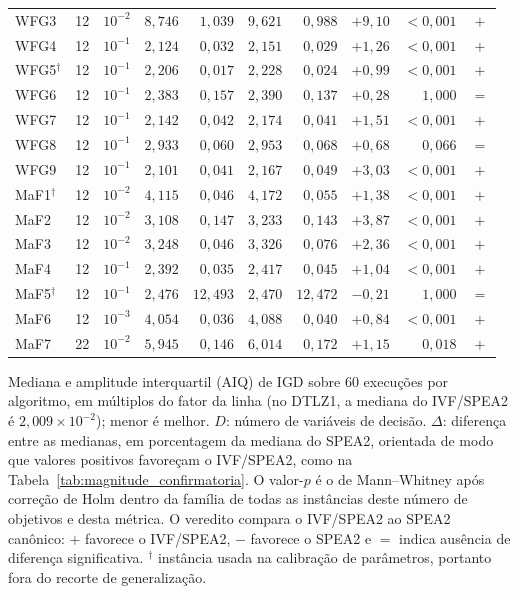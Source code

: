 \begin{table}[!htb]
\begin{tabular*}{\textwidth}{@{\extracolsep{\fill}}lrcrrrrrrc@{}}
        WFG3 & 12 & $10^{-2}$ & $8{,}746$ & $1{,}039$ & $9{,}621$ & $0{,}988$ & $+9{,}10$ & $<0{,}001$ & $+$ \\
        WFG4 & 12 & $10^{-1}$ & $2{,}124$ & $0{,}032$ & $2{,}151$ & $0{,}029$ & $+1{,}26$ & $<0{,}001$ & $+$ \\
        WFG5$^{\dagger}$ & 12 & $10^{-1}$ & $2{,}206$ & $0{,}017$ & $2{,}228$ & $0{,}024$ & $+0{,}99$ & $<0{,}001$ & $+$ \\
        WFG6 & 12 & $10^{-1}$ & $2{,}383$ & $0{,}157$ & $2{,}390$ & $0{,}137$ & $+0{,}28$ & $1{,}000$ & $=$ \\
        WFG7 & 12 & $10^{-1}$ & $2{,}142$ & $0{,}042$ & $2{,}174$ & $0{,}041$ & $+1{,}51$ & $<0{,}001$ & $+$ \\
        WFG8 & 12 & $10^{-1}$ & $2{,}933$ & $0{,}060$ & $2{,}953$ & $0{,}068$ & $+0{,}68$ & $0{,}066$ & $=$ \\
        WFG9 & 12 & $10^{-1}$ & $2{,}101$ & $0{,}041$ & $2{,}167$ & $0{,}049$ & $+3{,}03$ & $<0{,}001$ & $+$ \\
        \addlinespace
        MaF1$^{\dagger}$ & 12 & $10^{-2}$ & $4{,}115$ & $0{,}046$ & $4{,}172$ & $0{,}055$ & $+1{,}38$ & $<0{,}001$ & $+$ \\
        MaF2 & 12 & $10^{-2}$ & $3{,}108$ & $0{,}147$ & $3{,}233$ & $0{,}143$ & $+3{,}87$ & $<0{,}001$ & $+$ \\
        MaF3 & 12 & $10^{-2}$ & $3{,}248$ & $0{,}046$ & $3{,}326$ & $0{,}076$ & $+2{,}36$ & $<0{,}001$ & $+$ \\
        MaF4 & 12 & $10^{-1}$ & $2{,}392$ & $0{,}035$ & $2{,}417$ & $0{,}045$ & $+1{,}04$ & $<0{,}001$ & $+$ \\
        MaF5$^{\dagger}$ & 12 & $10^{-1}$ & $2{,}476$ & $12{,}493$ & $2{,}470$ & $12{,}472$ & $-0{,}21$ & $1{,}000$ & $=$ \\
        MaF6 & 12 & $10^{-3}$ & $4{,}054$ & $0{,}036$ & $4{,}088$ & $0{,}040$ & $+0{,}84$ & $<0{,}001$ & $+$ \\
        MaF7 & 22 & $10^{-2}$ & $5{,}945$ & $0{,}146$ & $6{,}014$ & $0{,}172$ & $+1{,}15$ & $0{,}018$ & $+$ \\
        \bottomrule
    \end{tabular*}
    \par\smallskip
    \parbox{\textwidth}{\footnotesize
    Mediana e amplitude interquartil (AIQ) de IGD sobre 60 execuções por algoritmo, em múltiplos do fator da linha (no DTLZ1, a mediana do IVF/SPEA2 é $2{,}009 \times 10^{-2}$); menor é melhor. $D$: número de variáveis de decisão. $\Delta$: diferença entre as medianas, em porcentagem da mediana do SPEA2, orientada de modo que valores positivos favoreçam o IVF/SPEA2, como na Tabela~\ref{tab:magnitude_confirmatoria}. O valor-$p$ é o de Mann--Whitney após correção de Holm dentro da família de todas as instâncias deste número de objetivos e desta métrica. O veredito compara o IVF/SPEA2 ao SPEA2 canônico: $+$ favorece o IVF/SPEA2, $-$ favorece o SPEA2 e $=$ indica ausência de diferença significativa. $^{\dagger}$ instância usada na calibração de parâmetros, portanto fora do recorte de generalização.
    }
\end{table}
